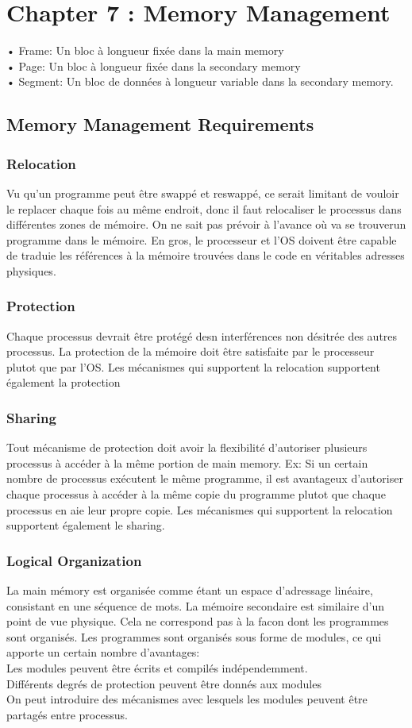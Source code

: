 \section{Chapter 7 : Memory Management}
• Frame: Un bloc à longueur fixée dans la main memory \\
• Page: Un bloc à longueur fixée dans la secondary memory \\
• Segment: Un bloc de données à longueur variable dans la secondary memory.
\\
\subsection{Memory Management Requirements}
\subsubsection{Relocation}
Vu qu'un programme peut être swappé et reswappé, ce serait limitant de vouloir le replacer chaque fois au même endroit, donc il faut relocaliser le processus dans différentes zones de mémoire.
On ne sait pas prévoir à l'avance où va se trouverun programme dans le mémoire.
En gros, le processeur et l'OS doivent être capable de traduie les références à la mémoire trouvées dans le code en véritables adresses physiques.
\subsubsection{Protection}
Chaque processus devrait être protégé desn interférences non désitrée des autres processus.
La protection de la mémoire doit être satisfaite par le processeur plutot que par l'OS.
Les mécanismes qui supportent la relocation supportent également la protection
\subsubsection{Sharing}
Tout mécanisme de protection doit avoir la flexibilité d'autoriser plusieurs processus à accéder à la même portion de main memory.
Ex: Si un certain nombre de processus exécutent le même programme, il est avantageux d'autoriser chaque processus à accéder à la même copie du programme plutot que chaque processus en aie leur propre copie.
Les mécanismes qui supportent la relocation supportent également le sharing.
\subsubsection{Logical Organization}
La main mémory est organisée comme étant un espace d'adressage linéaire, consistant en une séquence de mots.
La mémoire secondaire est similaire d'un point de vue physique.
Cela ne correspond pas à la facon dont les programmes sont organisés.
Les programmes sont organisés sous forme de modules, ce qui apporte un certain nombre d'avantages: \\
Les modules peuvent être écrits et compilés indépendemment.
 \\
Différents degrés de protection peuvent être donnés aux modules \\
On peut introduire des mécanismes avec lesquels les modules peuvent être partagés entre processus.
